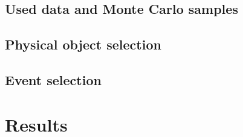 \section{Used data and Monte Carlo samples}
\section{Physical object selection}\label{physObj}
\section{Event selection}
\chapter{Results}
\appendix
